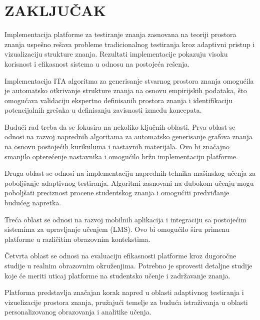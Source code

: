 \documentclass[conference]{IEEEtran}
\begin{document}
\section{ZAKLJUČAK}

Implementacija platforme za testiranje znanja zasnovana na teoriji prostora znanja uspešno rešava probleme tradicionalnog testiranja kroz adaptivni pristup i vizualizaciju strukture znanja. Rezultati implementacije pokazuju visoku korisnost i efikasnost sistema u odnosu na postojeća rešenja.

Implementacija ITA algoritma za generisanje stvarnog prostora znanja omogućila je automatsko otkrivanje strukture znanja na osnovu empirijskih podataka, što omogućava validaciju ekspertno definisanih prostora znanja i identifikaciju potencijalnih grešaka u definisanju zavisnosti između koncepata.

Budući rad treba da se fokusira na nekoliko ključnih oblasti. Prva oblast se odnosi na razvoj naprednih algoritama za automatsko generisanje grafova znanja na osnovu postojećih kurikuluma i nastavnih materijala. Ovo bi značajno smanjilo opterećenje nastavnika i omogućilo bržu implementaciju platforme.

Druga oblast se odnosi na implementaciju naprednih tehnika mašinskog učenja za poboljšanje adaptivnog testiranja. Algoritmi zasnovani na dubokom učenju mogu poboljšati preciznost procene studentskog znanja i omogućiti predviđanje budućeg napretka.

Treća oblast se odnosi na razvoj mobilnih aplikacija i integraciju sa postojećim sistemima za upravljanje učenjem (LMS). Ovo bi omogućilo širu primenu platforme u različitim obrazovnim kontekstima.

Četvrta oblast se odnosi na evaluaciju efikasnosti platforme kroz dugoročne studije u realnim obrazovnim okruženjima. Potrebno je sprovesti detaljne studije koje će meriti uticaj platforme na studentsko učenje i zadržavanje znanja.

Platforma predstavlja značajan korak napred u oblasti adaptivnog testiranja i vizuelizacije prostora znanja, pružajući temelje za buduća istraživanja u oblasti personalizovanog obrazovanja i analitike učenja.
\end{document}
